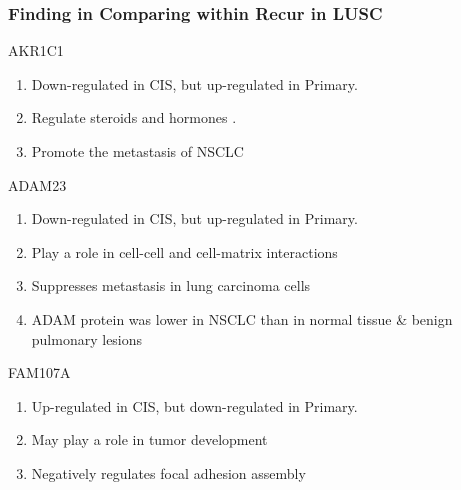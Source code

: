 \documentclass{beamer}
\begin{document}
    \begin{frame}[allowframebreaks]
        \frametitle{Finding in Comparing within Recur in LUSC}

        \begin{block}{AKR1C1}
            \begin{enumerate}
                \item Down-regulated in CIS, but up-regulated in Primary.
                \item Regulate steroids \cite{AKR1C1-1} and hormones \cite{AKR1C1-2}.
                \item Promote the metastasis of NSCLC \cite{AKR1C1-3}
            \end{enumerate}
        \end{block}

        \begin{block}{ADAM23}
            \begin{enumerate}
                \item Down-regulated in CIS, but up-regulated in Primary.
                \item Play a role in cell-cell and cell-matrix interactions \cite{ADAM23-1}
                \item Suppresses metastasis in lung carcinoma cells \cite{ADAM23-2}
                \item ADAM protein was lower in NSCLC than in normal tissue \& benign pulmonary lesions \cite{ADAM23-3}
            \end{enumerate}
        \end{block}

        \begin{block}{FAM107A}
            \begin{enumerate}
                \item Up-regulated in CIS, but down-regulated in Primary.
                \item May play a role in tumor development \cite{FAM107A1}
                \item Negatively regulates focal adhesion assembly \cite{FAM107A2}
            \end{enumerate}
        \end{block}
    \end{frame}
\end{document}
